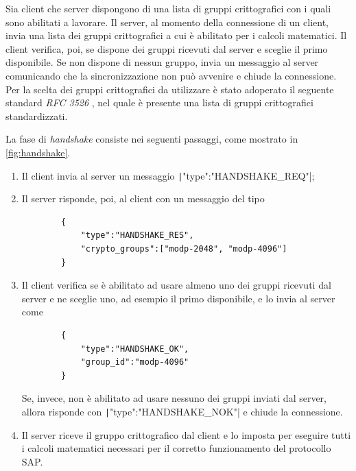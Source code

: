 Sia client che server dispongono di una lista di gruppi crittografici con i quali sono abilitati a lavorare. Il server, al momento della connessione di un client, invia una lista dei gruppi crittografici a cui è abilitato per i calcoli matematici. Il client verifica, poi, se dispone dei gruppi ricevuti dal server e sceglie il primo disponibile. Se non dispone di nessun gruppo, invia un messaggio al server comunicando che la sincronizzazione non può avvenire e chiude la connessione. Per la scelta dei gruppi crittografici da utilizzare è stato adoperato il seguente standard \textit{RFC 3526} \cite{rfc3526}, nel quale è presente una lista di gruppi crittografici standardizzati.


La fase di \textit{handshake} consiste nei seguenti passaggi, come mostrato in \autoref{fig:handshake}.

\begin{enumerate}
	\item Il client invia al server un messaggio \texttt|{"type":"HANDSHAKE_REQ"}|;
	\item {
    Il server risponde, poi, al client con un messaggio del tipo
    \begin{center}
      \begin{verbatim}
        {
            "type":"HANDSHAKE_RES",
            "crypto_groups":["modp-2048", "modp-4096"]
        }
      \end{verbatim}
    \end{center}
    }
	\item Il client verifica se è abilitato ad usare almeno uno dei gruppi ricevuti dal server e ne sceglie uno, ad esempio il primo disponibile, e lo invia al server come
	\begin{center}
      \begin{verbatim}
        {
            "type":"HANDSHAKE_OK",
            "group_id":"modp-4096"
        }    
	    \end{verbatim}
	\end{center}
	Se, invece, non è abilitato ad usare nessuno dei gruppi inviati dal server, allora risponde con \texttt|{"type":"HANDSHAKE_NOK"}| e chiude la connessione.
	\item Il server riceve il gruppo crittografico dal client e lo imposta per eseguire tutti i calcoli matematici necessari per il corretto funzionamento del protocollo SAP.
\end{enumerate}

